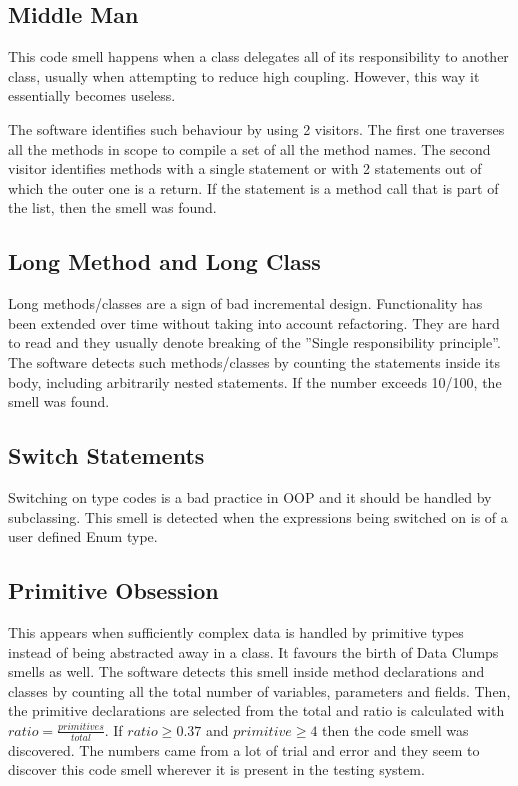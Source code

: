 \documentclass[a4paper]{article}
\begin{document}
\subsection{Middle Man}
This code smell happens when a class delegates all of its responsibility to
another class, usually when attempting to reduce high coupling. However, this
way it essentially becomes useless.

The software identifies such behaviour by using 2 visitors.
The first one traverses all the methods in scope to compile a set of all the
method names.
The second visitor identifies methods with a single statement or with 2
statements
out of which the outer one is a return.
If the statement is a method call that is part of the list, then the smell was
found.

\subsection{Long Method and Long Class}
Long methods/classes are a sign of bad incremental design.
Functionality has been
extended over time without taking into account refactoring.
They are hard to read and they usually denote breaking of the
''Single responsibility principle''.
The software detects such methods/classes by counting the statements inside its
body, including arbitrarily nested statements.
If the number exceeds 10/100, the smell was found.

\subsection{Switch Statements}
Switching on type codes is a bad practice in OOP and it should be handled by
subclassing.
This smell is detected when the expressions being switched on is of
a user defined Enum type.

\subsection{Primitive Obsession}
This appears when sufficiently complex data is handled by primitive types
instead of being abstracted away in a class.
It favours the birth of Data Clumps smells as well.
The software detects this smell inside method declarations and classes by
counting all the total number of variables, parameters and fields.
Then, the primitive declarations are selected from the total and ratio
is calculated with $ratio=\frac{primitives}{total}$.
If $ratio \geq 0.37$ and $primitive \geq 4$ then the code smell was discovered.
The numbers came from a lot of trial and error and they seem to discover this
code smell wherever it is present in the testing system.
\end{document}
